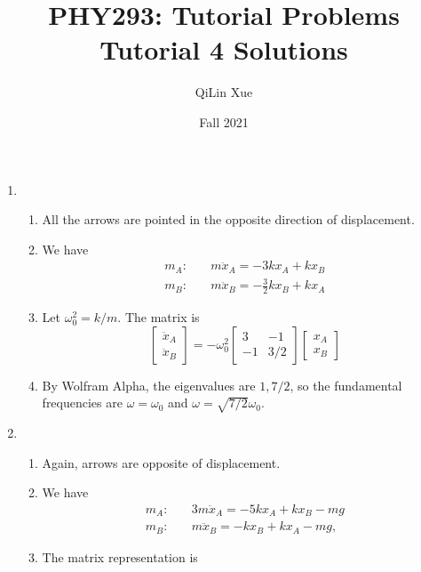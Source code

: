 \documentclass{article}
\title{PHY293: Tutorial Problems \\ \textbf{Tutorial 4 Solutions}}
\author{QiLin Xue}
\date{Fall 2021}
\begin{document}
\maketitle
\begin{enumerate}
    \item \begin{enumerate}
        \item All the arrows are pointed in the opposite direction of displacement.
        \item We have 
        \begin{align}
            m_A:&\quad m\ddot{x}_A = -3kx_A + kx_B \\ 
            m_B:&\quad m\ddot{x}_B = -\frac{3}{2}kx_B +kx_A
        \end{align}
        \item Let $\omega_0^2 = k/m$. The matrix is 
        \begin{equation}
            \begin{bmatrix}
                \ddot{x}_A \\ 
                \ddot{x}_B
            \end{bmatrix} = -\omega_0^2\begin{bmatrix}
                3 & -1 \\ 
                -1 & 3/2    
            \end{bmatrix}\begin{bmatrix}
                x_A \\ x_B
            \end{bmatrix}
        \end{equation}
        \item By Wolfram Alpha, the eigenvalues are $1,7/2$, so the fundamental frequencies are $\omega = \omega_0$ and $\omega = \sqrt{7/2}\omega_0$.
    \end{enumerate}
    \item \begin{enumerate}
        \item Again, arrows are opposite of displacement.
        \item We have 
        \begin{align}
            m_A:&\quad 3m\ddot{x}_A = -5kx_A + kx_B - mg\\ 
            m_B:&\quad m\ddot{x}_B = -kx_B +kx_A - mg,
        \end{align}
        \item The matrix representation is
        \begin{equation}

\end{equation}
\end{enumerate}
\end{enumerate}
\end{document}
